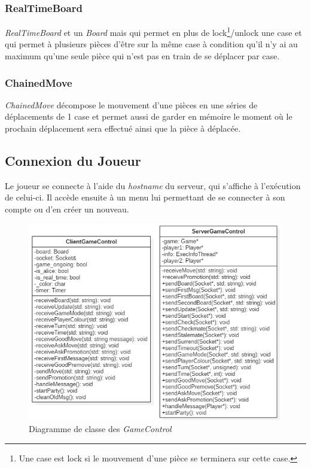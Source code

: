 \documentclass[10pt, a4paper]{article}
\begin{document}
\subsubsection{RealTimeBoard}
\textit{RealTimeBoard} et un \textit{Board} mais qui permet en plus de lock\footnote{Une case est lock si le mouvement d'une pièce se terminera sur cette case.}/unlock une case et qui permet à plusieurs pièces d'être sur la même case à condition qu'il n'y ai au maximum qu'une seule pièce qui n'est pas en train de se déplacer par case.

\subsubsection{ChainedMove}
\textit{ChainedMove} décompose le mouvement d'une pièces en une séries de déplacements de 1 case et permet aussi de garder en mémoire le moment où le prochain déplacement sera effectué ainsi que la pièce à déplacée.

\newpage

\subsection{Connexion du Joueur}
Le joueur se connecte à l'aide du \textit{hostname} du serveur, qui s'affiche à l'exécution de celui-ci. Il accède ensuite à un menu lui permettant de se connecter à son compte ou d'en créer un nouveau.

\begin{figure}[H]
\centering
\includegraphics[scale=0.72]{client_server_control.png}
\caption{Diagramme de classe des \textit{GameControl}}
\end{figure}
\end{document}
